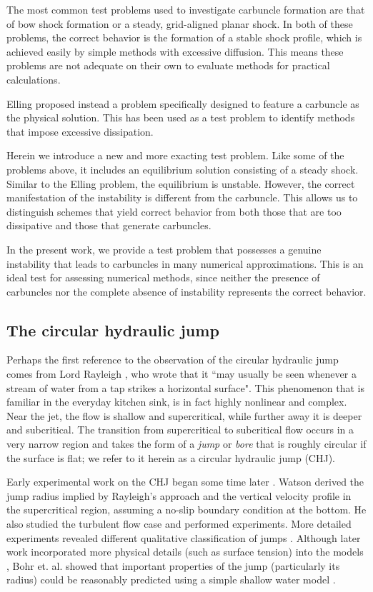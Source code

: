 \documentclass[preprint, 11pt]{article}
\begin{document}
The most common test problems used to investigate carbuncle formation are
that of bow shock formation or a steady, grid-aligned planar shock.
In both of these problems, the correct behavior is the formation of a stable
shock profile, which is achieved easily by simple methods with excessive
diffusion.  This means these problems are not adequate on their own to
evaluate methods for practical calculations.

Elling \cite{elling2009carbuncle} proposed instead a problem specifically
designed to feature a carbuncle as the physical solution.  This has
been used as a test problem to identify methods that impose excessive dissipation.

Herein we introduce a new and more exacting test problem.  Like some
of the problems above, it includes an equilibrium solution consisting of a
steady shock.  Similar to the Elling problem, the equilibrium is unstable.
However, the correct manifestation of the instability is different from
the carbuncle.  This allows us to distinguish schemes that yield correct
behavior from both those that are too dissipative and those that generate
carbuncles.

In the present work, we provide a test problem that possesses a genuine instability
that leads to carbuncles in many numerical approximations.  This is an ideal
test for assessing numerical methods, since neither the presence of carbuncles
nor the complete absence of instability represents the correct behavior.


\subsection{The circular hydraulic jump}

Perhaps the first reference to the observation of the circular hydraulic jump
comes from Lord Rayleigh \cite{rayleigh1914theory}, who wrote that it
``may usually be seen whenever a stream of water from a tap strikes a horizontal
surface".  This phenomenon that is familiar in the everyday kitchen sink, is in
fact highly nonlinear and complex.  Near the jet, the flow is shallow and
supercritical, while further away it is deeper and subcritical.  The transition from supercritical
to subcritical flow
occurs in a very narrow region and takes the form of a \emph{jump} or \emph{bore}
that is roughly circular if the surface is flat; we refer to it herein as a
circular hydraulic jump (CHJ).

Early experimental work on the CHJ began some time later
\cite{kurihara1946hydraulic,tani1949water,watson1964radial}.
Watson \cite{watson1964radial} derived the jump radius
implied by Rayleigh's approach and the vertical
velocity profile in the supercritical region, assuming a no-slip
boundary condition at the bottom.  He also studied the turbulent
flow case and performed experiments.
More detailed experiments revealed different qualitative classification
of jumps  \cite{ishigai1977heat,craik1981circular}.
Although later work incorporated more physical details (such as surface tension) into the models
\cite{bush2003influence}, Bohr et. al. showed that important properties of the jump
(particularly its radius) could be reasonably predicted using a simple shallow water
model \cite{bohr1993shallow}.
\end{document}

